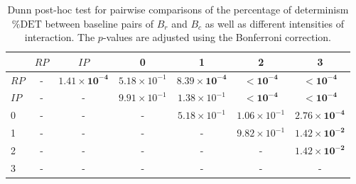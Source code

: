 \begin{table}
\centering
\caption{Dunn post-hoc test for pairwise comparisons of the percentage of determinism $\%\text{DET}$ between baseline pairs of $B_r$ and $B_c$ as well as different intensities of interaction. The $p$-values are adjusted using the Bonferroni correction.}
\label{tab:dunn_det}
\begin{tabular}{lcccccc}
\toprule
 & $RP$ & $IP$ & 0 & 1 & 2 & 3 \\
\midrule
$RP$ & - & $\mathbf{1.41 \times 10^{-4}}$ & $5.18 \times 10^{-1}$ & $\mathbf{8.39 \times 10^{-4}}$ & $\mathbf{< 10^{-4}}$ & $\mathbf{< 10^{-4}}$ \\
$IP$ & - & - & $9.91 \times 10^{-1}$ & $1.38 \times 10^{-1}$ & $\mathbf{< 10^{-4}}$ & $\mathbf{< 10^{-4}}$ \\
0 & - & - & - & $5.18 \times 10^{-1}$ & $1.06 \times 10^{-1}$ & $\mathbf{2.76 \times 10^{-4}}$ \\
1 & - & - & - & - & $9.82 \times 10^{-1}$ & $\mathbf{1.42 \times 10^{-2}}$ \\
2 & - & - & - & - & - & $\mathbf{1.42 \times 10^{-2}}$ \\
3 & - & - & - & - & - & - \\
\bottomrule
\end{tabular}
\end{table}
